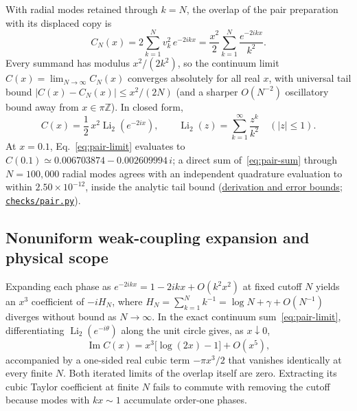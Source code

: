 \documentclass[10pt,a4paper]{article}
\numberwithin{equation}{section}
\newcommand{\repo}[2]{\href{https://github.com/sprajs/quantum-gravity/blob/main/#1}{#2}}
\begin{document}
With radial modes retained through $k=N$, the overlap of the pair preparation with its displaced copy is
\begin{equation}
  C_N(x) = 2\sum_{k=1}^{N} v_k^2\, e^{-2ikx}
  = \frac{x^2}{2}\sum_{k=1}^{N} \frac{e^{-2ikx}}{k^2}.
  \label{eq:pair-sum}
\end{equation}
Every summand has modulus $x^2/(2k^2)$, so the continuum limit $C(x)=\lim_{N\to\infty}C_N(x)$ converges absolutely for all real $x$, with universal tail bound $|C(x)-C_N(x)|\le x^2/(2N)$ (and a sharper $O(N^{-2})$ oscillatory bound away from $x\in\pi\mathbb{Z}$).
In closed form,
\begin{equation}
  C(x) = \frac{1}{2}\,x^2 \operatorname{Li}_2\!\left(e^{-2ix}\right),
  \qquad
  \operatorname{Li}_2(z) = \sum_{k=1}^{\infty}\frac{z^k}{k^2}\quad (|z|\le 1).
  \label{eq:pair-limit}
\end{equation}
At $x=0.1$, Eq.~\eqref{eq:pair-limit} evaluates to $C(0.1) \simeq 0.006703874 - 0.002609994\,i$; a direct sum of~\eqref{eq:pair-sum} through $N=100{,}000$ radial modes agrees with an independent quadrature evaluation to within $2.50\times 10^{-12}$, inside the analytic tail bound (\repo{audit/04-pair.md}{derivation and error bounds}; \repo{checks/pair.py}{\texttt{checks/pair.py}}).

\subsection{Nonuniform weak-coupling expansion and physical scope}

Expanding each phase as $e^{-2ikx} = 1 - 2ikx + O(k^2 x^2)$ at fixed cutoff $N$ yields an $x^3$ coefficient of $-iH_N$, where $H_N = \sum_{k=1}^{N} k^{-1} = \log N + \gamma + O(N^{-1})$ diverges without bound as $N\to\infty$.
In the exact continuum sum~\eqref{eq:pair-limit}, differentiating $\operatorname{Li}_2(e^{-i\theta})$ along the unit circle gives, as $x\downarrow 0$,
\begin{equation}
  \operatorname{Im} C(x) = x^3\bigl[\log(2x) - 1\bigr] + O(x^5),
  \label{eq:pair-asymp}
\end{equation}
accompanied by a one-sided real cubic term $-\pi x^3/2$ that vanishes identically at every finite $N$.
Both iterated limits of the overlap itself are zero. Extracting its cubic Taylor coefficient at finite $N$ fails to commute with removing the cutoff because modes with $kx\sim 1$ accumulate order-one phases.
\end{document}
